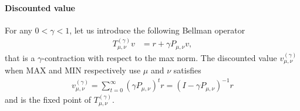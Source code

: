\documentclass{article}
\begin{document}
\paragraph{Discounted value}

For any $0<\gamma<1$, let us introduce the following Bellman operator
\begin{align}
  T^{(\gamma)}_{\mu,\nu}v &= r + \gamma P_{\mu,\nu}v,%
\end{align}
that is a $\gamma$-contraction with respect to the max norm.
The discounted value $v^{(\gamma)}_{\mu,\nu}$ when MAX and MIN respectively use $\mu$ and $\nu$ satisfies
\begin{align}
  v^{(\gamma)}_{\mu,\nu} = \sum_{t=0}^{\infty} (\gamma P_{\mu,\nu})^t r = (I-\gamma P_{\mu,\nu})^{-1} r
\end{align}
and is the fixed point of $T^{(\gamma)}_{\mu,\nu}$.
\end{document}
